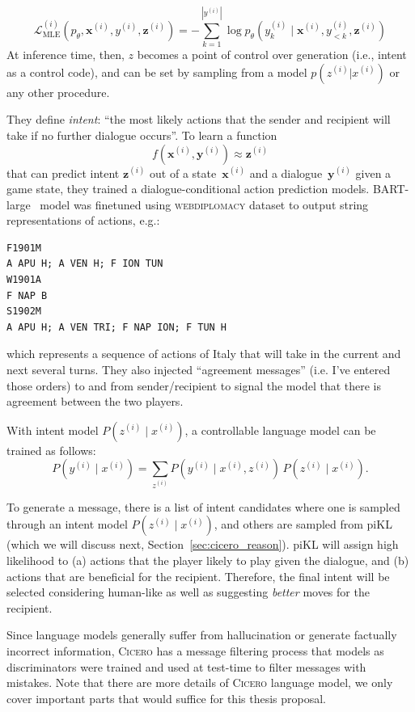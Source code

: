 \documentclass[oneside]{memoir}
\newcommand{\cicero}{\abr{Cicero} }
\newcommand{\abr}[1]{\textsc{#1}}
\begin{document}
\begin{equation}
\mathcal{L}^{(i)}_{\text{MLE}}(p_\theta, \mathbf{x}^{(i)}, y^{(i)},  \mathbf{z}^{(i)}) = - \sum_{k=1}^{|y^{(i)}|} \log p_\theta\left(y^{(i)}_k \mid \mathbf{x}^{(i)}, y^{(i)}_{<k}, \mathbf{z}^{(i)}\right)
\label{eq:intent}
\end{equation}
At inference time, then, $z$ becomes a point of control over generation (i.e., intent as a control code), and can be set by sampling from a model $p(z^{(i)} | x^{(i)})$ or any other procedure. 

They define \textit{intent}: ``the most likely actions that the sender and recipient will take if no further dialogue occurs''. To learn a function \[
f(\mathbf{x}^{(i)}, \mathbf{y}^{(i)}) \approx \mathbf{z}^{(i)}
\] that can predict intent $\mathbf{z}^{(i)}$ out of a state~$\mathbf{x}^{(i)}$ and a dialogue~$\mathbf{y}^{(i)}$ given a game state, they trained a dialogue-conditional action prediction models. BART-large~\cite{} model was finetuned using \abr{webdiplomacy} dataset to output string representations of actions, e.g.:
\begin{verbatim}
F1901M
A APU H; A VEN H; F ION TUN
W1901A
F NAP B
S1902M
A APU H; A VEN TRI; F NAP ION; F TUN H
\end{verbatim}
which represents a sequence of actions of Italy that will take in the current and next several turns. They also injected ``agreement messages'' (i.e. I've entered those orders) to and from sender/recipient to signal the model that there is agreement between the two players.

With intent model $P(z^{(i)} \mid x^{(i)})$, a controllable language model can be trained as follows:
\[
P(y^{(i)} \mid x^{(i)}) = \sum_{z^{(i)}} P(y^{(i)} \mid x^{(i)}, z^{(i)}) \, P(z^{(i)} \mid x^{(i)}).
\]

To generate a message, there is a list of intent candidates where one is sampled through an intent model $P(z^{(i)} \mid x^{(i)})$, and others are sampled from piKL (which we will discuss next, Section~\ref{sec:cicero_reason}). piKL will assign high likelihood to (a) actions that the player likely to play given the dialogue, and (b) actions that are beneficial for the recipient. Therefore, the final intent will be selected considering human-like as well as suggesting \textit{better} moves for the recipient. 

Since language models generally suffer from hallucination or generate factually incorrect information, \cicero has a message filtering process that models as discriminators were trained and used at test-time to filter messages with mistakes. Note that there are more details of \cicero language model, we only cover important parts that would suffice for this thesis proposal.
\end{document}
